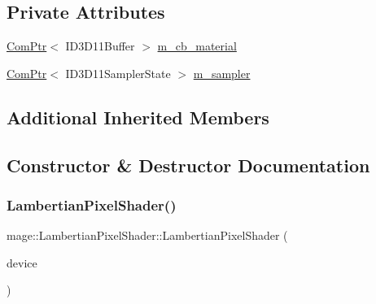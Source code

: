 \subsection*{Private Attributes}
\begin{DoxyCompactItemize}
\item 
\hyperlink{namespacemage_ae74f374780900893caa5555d1031fd79}{Com\+Ptr}$<$ I\+D3\+D11\+Buffer $>$ \hyperlink{classmage_1_1_lambertian_pixel_shader_aff89982b5f85531515ec2316930b2944}{m\+\_\+cb\+\_\+material}
\item 
\hyperlink{namespacemage_ae74f374780900893caa5555d1031fd79}{Com\+Ptr}$<$ I\+D3\+D11\+Sampler\+State $>$ \hyperlink{classmage_1_1_lambertian_pixel_shader_af90588b8ecf4ba9aa796ee3ed74519b5}{m\+\_\+sampler}
\end{DoxyCompactItemize}
\subsection*{Additional Inherited Members}


\subsection{Constructor \& Destructor Documentation}
\hypertarget{classmage_1_1_lambertian_pixel_shader_ad473bfad8be0f47f6d8a9993ef4754de}{}\label{classmage_1_1_lambertian_pixel_shader_ad473bfad8be0f47f6d8a9993ef4754de} 
\subsubsection{\texorpdfstring{Lambertian\+Pixel\+Shader()}{LambertianPixelShader()}\hspace{0.1cm}{\footnotesize\ttfamily [1/2]}}
{\footnotesize\ttfamily mage\+::\+Lambertian\+Pixel\+Shader\+::\+Lambertian\+Pixel\+Shader (\begin{DoxyParamCaption}\item[{const \hyperlink{classmage_1_1_rendering_device}{Rendering\+Device} \&}]{device }\end{DoxyParamCaption})}

\hypertarget{classmage_1_1_lambertian_pixel_shader_aedea7342ae95c6532a086fb28978b5b0}{}\label{classmage_1_1_lambertian_pixel_shader_aedea7342ae95c6532a086fb28978b5b0} 
